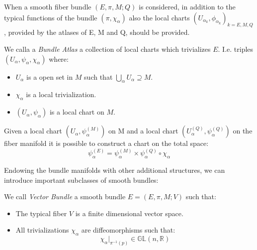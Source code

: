 \documentclass[Main]{subfiles}
\begin{document}
			When a smooth fiber bundle $(E,\pi,M;Q)$ is considered, in addition to the typical functions of the bundle $(\pi, \chi_{\alpha})$ also the local charts $(U_{\alpha_k}, \phi_{\alpha_k})_{k = E,M,Q}$, provided by the atlases of E, M and Q, should be provided.
			\begin{definition}
				We calla a \emph{Bundle Atlas} a collection of local charts which trivializes $E$. I.e. triples  $(U_\alpha, \psi_\alpha, \chi_\alpha)$ where:
				\begin{itemize}
					\item $U_\alpha$ is a open set in $M$ such that $\bigcup_{\alpha} U_{\alpha} \supseteq M$.
					\item $\chi_\alpha$  is a local trivialization.
					\item $(U_\alpha,\psi_\alpha)$ is a local chart on $M$.
				\end{itemize}		
			\end{definition}
			\begin{observation}
				Given a local chart $(U_\alpha, \psi_\alpha^{(M)} )$ on M and a local chart $(U_\alpha^{(Q)}, \psi_\alpha^{(Q)})$ on the fiber manifold it is possible to construct a chart on the total space:	
				\begin{displaymath}
							\psi^{(E)}_\alpha = \psi_\alpha^{(M)} \times  \psi_\alpha^{(Q)} \circ \chi_\alpha
				\end{displaymath}	
			\end{observation}
			
			Endowing the bundle manifolds with other additional structures, we can introduce important subclasses of smooth bundles:
			\begin{definition}
				We call \emph{Vector Bundle} a smooth bundle $E=(E,\pi,M;V)$ such that:
				\begin{itemize}
					\item The typical fiber $V$ is a finite dimensional vector space.	
					\item All trivializations $\chi_{\alpha} $ are diffeomorphisms such that:
						\begin{displaymath}
							\chi_{\alpha}\vert_{\pi^{-1}(p)} \in \mathbb{GL}(n, \mathbb{R})
						\end{displaymath}
				\end{itemize}
			\end{definition}
\end{document}
